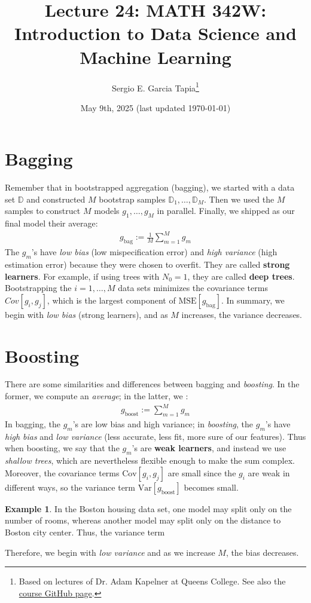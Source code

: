 \documentclass[12pt, a4paper]{article}
\title{Lecture 24: MATH 342W: Introduction to Data Science and Machine Learning}
\author{Sergio E. Garcia Tapia\thanks{Based on lectures of Dr. Adam Kapelner at Queens College.
See also the \href{https://github.com/kapelner/QC_MATH_342W_Spring_2025}{course GitHub page}.}}
\date{May 9th, 2025 (last updated \today)}
\theoremstyle{definition}
\newtheorem*{example}{Example}
\begin{document}
	\maketitle
	\section{Bagging}
	Remember that in bootstrapped aggregation (bagging), we started
	with a data set $\mathbb{D}$ and constructed $M$ bootstrap samples
	$\mathbb{D}_1,\ldots,\mathbb{D}_M$. Then we used the $M$ samples
	to construct $M$ models $g_1,\ldots,g_M$ in parallel. Finally,
	we shipped as our final model their average:
	\begin{align*}
		g_{\text{bag}} := \frac{1}{M}\sum_{m=1}^{M}g_m
	\end{align*}
	The $g_m$'s have \textit{low bias} (low mispecification error) and
	\textit{high variance} (high estimation error) because they were chosen
	to overfit. They are called \textbf{strong learners}. For example,
	if using trees with $N_0 = 1$, they are called \textbf{deep trees}.
	Bootstrapping the $i=1,\ldots,M$ data sets minimizes the covariance terms
	$\textit{Cov}[g_i, g_j]$, which is the largest component of $\text{MSE}[g_{\text{bag}}]$.
	In summary, we begin with \textit{low bias} (strong learners), and as $M$
	increases, the variance decreases.
	\section{Boosting}
	There are some similarities and differences between bagging and \textit{boosting}.
	In the former, we compute an \textit{average}; in the latter, we :
	\begin{align*}
		g_{\text{boost}} := \sum_{m=1}^{M}g_m
	\end{align*}
	In bagging, the $g_m$'s are low bias and high variance; in \textit{boosting},
	the $g_m$'s have \textit{high bias} and \textit{low variance} (less accurate,
	less fit, more sure of our features). Thus when boosting, we say that the $g_m$'s
	are \textbf{weak learners}, and instead we use \textit{shallow trees},
	which are nevertheless flexible enough to make the sum complex. Moreover,
	the covariance terms $\text{Cov}[g_i, g_j]$ are small since the $g_i$ are weak
	in different ways, so the variance term $\text{Var}[g_{\text{boost}}]$ becomes small.
	\begin{tcolorbox}[breakable]
		\begin{example}
			In the Boston housing data set, one model may split only on 
			the number of rooms, whereas another model may split only on
			the distance to Boston city center. Thus, the variance term
		\end{example}
	\end{tcolorbox}
	Therefore, we begin with \textit{low variance} and as we increase $M$,
	the bias decreases.
	
\end{document}
